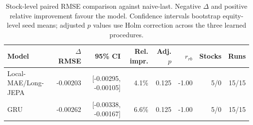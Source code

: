 \begin{table}[t]
\centering
\small
\caption{Stock-level paired RMSE comparison against naive-last. Negative $\Delta$ and positive relative improvement favour the model. Confidence intervals bootstrap equity-level seed means; adjusted $p$ values use Holm correction across the three learned procedures.}
\label{tab:paired_rmse_naive}
\begin{tabular}{lrrrrrrr}
\toprule
Model & $\Delta$RMSE & 95\% CI & Rel. impr. & Adj. $p$ & $r_{rb}$ & Stocks & Runs \\
\midrule
Local-MAE/Long-JEPA & -0.00203 & [-0.00295, -0.00105] & 4.1\% & 0.125 & -1.00 & 5/0 & 15/15 \\
GRU & -0.00262 & [-0.00338, -0.00167] & 6.6\% & 0.125 & -1.00 & 5/0 & 15/15 \\
\bottomrule
\end{tabular}
\end{table}
